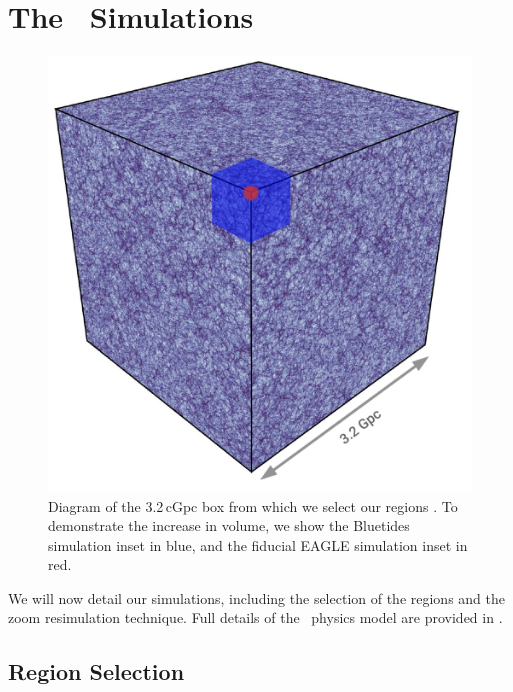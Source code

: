 \section{The \flare\ Simulations}
\label{sec:method}

\begin{figure}
	\includegraphics[width=\columnwidth]{images/parent_box.pdf}
    \caption{Diagram of the 3.2\,cGpc box from which we select our regions \citep{barnes_redshift_2017}.
		To demonstrate the increase in volume, we show the Bluetides simulation \protect\citep[$L = 570$\,cMpc;][]{feng_bluetides_2016} inset in blue, and the fiducial EAGLE simulation \protect\citep[$L = 100$\,cMpc;][]{schaye_eagle_2015} inset in red.}
    \label{fig:L3200}
\end{figure}

We will now detail our simulations, including the selection of the regions and the zoom resimulation technique.
Full details of the \eagle\ physics model are provided in \cite{schaye_eagle_2015,crain_eagle_2015}.

\subsection{Region Selection}
\label{sec:method:region}

